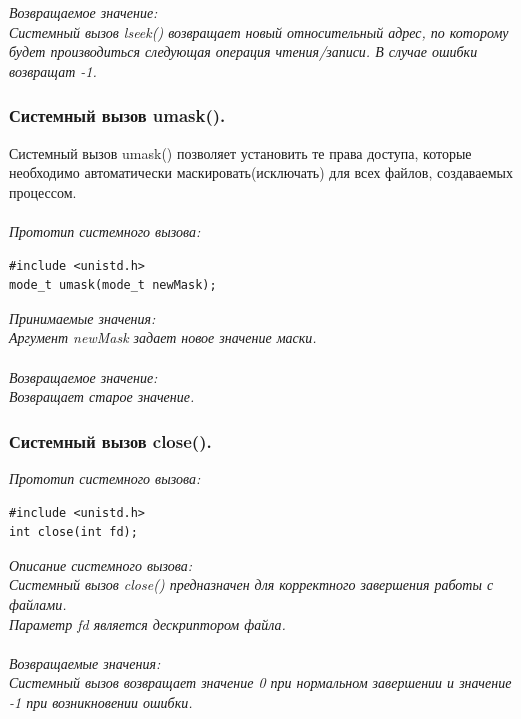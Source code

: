 \documentclass[a4paper]{article}
\begin{document}
\sl Возвращаемое значение:\\
\rm Системный вызов lseek() возвращает новый относительный адрес, по которому будет производиться следующая операция чтения/записи. В случае ошибки возвращат -1.

\subsubsection{\Large Системный вызов umask().}
Системный вызов umask() позволяет установить те права доступа, которые необходимо автоматически маскировать(исключать) для всех файлов, создаваемых процессом. \\\\
\sl Прототип системного вызова:
\begin{verbatim}
#include <unistd.h>
mode_t umask(mode_t newMask);
\end{verbatim}
\sl Принимаемые значения:\\
\rm Аргумент newMask задает новое значение маски.\\\\
\sl Возвращаемое значение:\\
\rm Возвращает старое значение.

\subsubsection{\Large Системный вызов close().}
\sl Прототип системного вызова:
\begin{verbatim}
#include <unistd.h>
int close(int fd);  
\end{verbatim}
\sl Описание системного вызова:\\
\rm Системный вызов close() предназначен для корректного завершения работы с файлами.\\
Параметр \sl fd \rm является дескриптором файла.\\\\
\sl Возвращаемые значения:\\
\rm Системный вызов возвращает значение 0 при нормальном завершении и значение -1 при возникновении ошибки.
\end{document}
